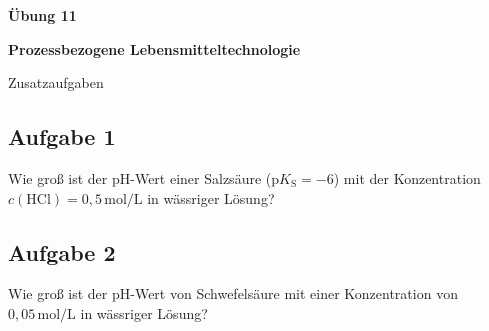 \documentclass[a4paper,11pt]{article}
\newif\ifshowme
\begin{document}


\begin{center}
\LARGE
\color{uniblau}
\textbf{Übung 11} \par \vspace*{2mm}
\large \color{miugray!50!black} \textbf{Prozessbezogene Lebensmitteltechnologie}\par 
\normalsize Zusatzaufgaben
\end{center}
\par 


\color{miudiutex}


\subsection*{Aufgabe 1}
Wie groß ist der pH-Wert einer Salzsäure ($\text{p}K_\text{S} = -6$) mit der Konzentration $c(\text{HCl}) = 0{,}5\,\text{mol/L}$ in wässriger Lösung?

\ifshowme
\antwort{
\begin{equation*}
    \text{pH} = -\lg(0{,}5) = 0{,}3
\end{equation*}

Der pH-Wert einer $0{,}5$ molaren Salzsäure liegt bei $0{,}3$.
}
\else
\fi

\vspace{1.5em}

\subsection*{Aufgabe 2}
    Wie groß ist der pH-Wert von Schwefelsäure mit einer Konzentration von $0{,}05\,\text{mol/L}$ in wässriger Lösung?
    
\ifshowme
 \antwort{   
    $\text{p}K_\text{S}$ der ersten Protonierung $-3$, bei der zweiten $1{,}9$ (irrelevant)
 
    \begin{equation*}
        \text{pH} = -\log(2 \cdot 0{,}05\,\text{mol/L}) = 1{,}0
    \end{equation*}
    }
\else
\fi
    
\pp

\begin{center}

\end{center}
\end{document}
